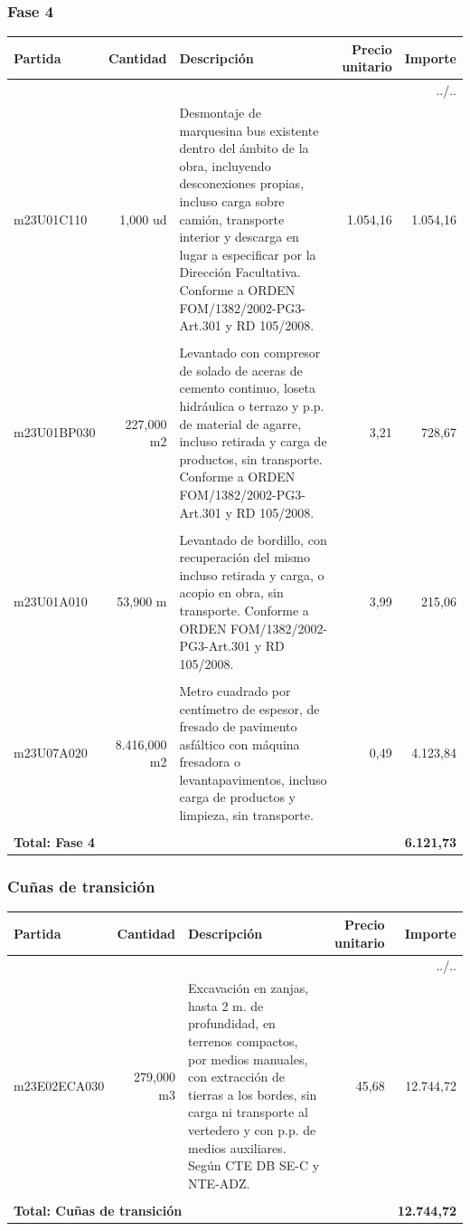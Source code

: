 \documentclass{book}%
\begin{document}
\subsubsection{Fase 4}%
\small%
\begin{longtable}{lrlrr}%
Partida&Cantidad&Descripción&\multicolumn{1}{p{1.5cm}}{Precio unitario}&Importe\\%
\hline%
\endhead%
\multicolumn{5}{r}{../..}\\%
\endfoot%
\hline%
\endlastfoot%
m23U01C110&     1,000 ud&\multicolumn{1}{p{5cm}}{Desmontaje de marquesina bus existente dentro del ámbito de la obra, incluyendo desconexiones propias, incluso carga sobre camión, transporte interior y descarga en lugar a especificar por la Dirección Facultativa. Conforme a ORDEN FOM/1382/2002{-}PG3{-}Art.301 y RD 105/2008.}&  1.054,16&1.054,16\\%
&&&&\\%
m23U01BP030&   227,000 m2&\multicolumn{1}{p{5cm}}{Levantado con compresor de solado de aceras de cemento continuo, loseta hidráulica o terrazo y p.p. de material de agarre, incluso retirada y carga de productos, sin transporte. Conforme a ORDEN FOM/1382/2002{-}PG3{-}Art.301 y RD 105/2008.}&      3,21&728,67\\%
&&&&\\%
m23U01A010&    53,900 m&\multicolumn{1}{p{5cm}}{Levantado de bordillo, con recuperación del mismo incluso retirada y carga, o acopio en obra, sin transporte. Conforme a ORDEN FOM/1382/2002{-}PG3{-}Art.301 y RD 105/2008.}&      3,99&215,06\\%
&&&&\\%
m23U07A020& 8.416,000 m2&\multicolumn{1}{p{5cm}}{Metro cuadrado por centímetro de espesor, de fresado de pavimento asfáltico con máquina fresadora o levantapavimentos, incluso carga de productos y limpieza, sin transporte.}&      0,49&4.123,84\\%
&&&&\\%
\multicolumn{4}{p{8cm}}{\textbf{Total: Fase 4}}&\textbf{6.121,73}\\%
\end{longtable}%
\normalsize

%
\subsubsection{Cuñas de transición}%
\small%
\begin{longtable}{lrlrr}%
Partida&Cantidad&Descripción&\multicolumn{1}{p{1.5cm}}{Precio unitario}&Importe\\%
\hline%
\endhead%
\multicolumn{5}{r}{../..}\\%
\endfoot%
\hline%
\endlastfoot%
m23E02ECA030&   279,000 m3&\multicolumn{1}{p{5cm}}{Excavación en zanjas, hasta 2 m. de profundidad, en terrenos compactos, por medios manuales, con extracción de tierras a los bordes, sin carga ni transporte al vertedero y con p.p. de medios auxiliares. Según CTE DB SE{-}C y NTE{-}ADZ.}&     45,68&12.744,72\\%
&&&&\\%
\multicolumn{4}{p{8cm}}{\textbf{Total: Cuñas de transición}}&\textbf{12.744,72}\\%
\end{longtable}%
\normalsize
\end{document}
